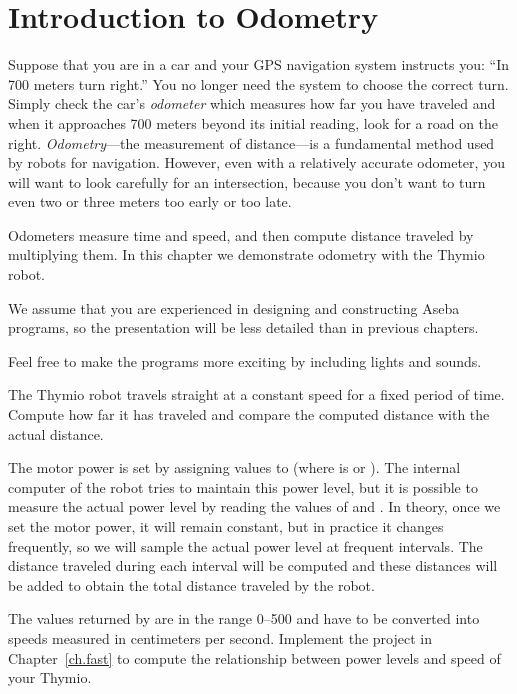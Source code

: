 
\chapter{Introduction to Odometry}\label{ch.odo}

Suppose that you are in a car and your GPS navigation system
instructs you: ``In 700 meters turn right.'' You no longer need the
system to choose the correct turn. Simply check the car's
\emph{odometer} which measures how far you have traveled and when it
approaches 700 meters beyond its initial reading, look for a road
on the right. \emph{Odometry}---the measurement of distance---is a
fundamental method used by robots for navigation.
However, even with a relatively accurate odometer, you will
want to look carefully for an intersection, because you don't want to
turn even two or three meters too early or too late.

Odometers measure time and speed,
and then compute distance traveled by multiplying them. In
this chapter we demonstrate odometry with the Thymio robot.

We assume that you are experienced in designing and constructing
Aseba programs, so the presentation will be less detailed
than in previous chapters.

Feel free to make the programs more exciting by including lights
and sounds.


The Thymio robot travels straight at a constant speed for a fixed
period of time. Compute how far it has traveled and compare the
computed distance with the actual distance.


The motor power is set by assigning values to
 (where  is  or ). The internal
computer of the robot tries to maintain this power level, but it is
possible to measure the actual power level by reading the values of
 and . In theory, once we set
the motor power, it will remain constant, but in practice it changes
frequently, so we will sample the actual power level at frequent
intervals. The distance traveled during each interval will be computed
and these distances will be added to obtain the total distance
traveled by the robot.

The values returned by  are in the range 0--500 and
have to be converted into speeds measured in centimeters per second.
Implement the project in Chapter~\ref{ch.fast}
to compute the relationship between
power levels and speed of your Thymio.

